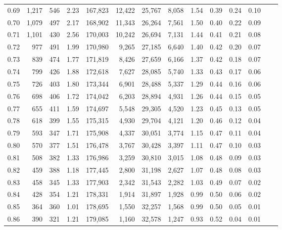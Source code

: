 \begin{tabular}{rrrrrrrrrrrrrr}
0.69 &  1,217 &  546 &    2.23 &  167,823 &   12,422 &  25,767 &   8,058 &  1.54 &  0.39 &  0.24 &      0.10 \\
0.70 &  1,079 &  497 &    2.17 &  168,902 &   11,343 &  26,264 &   7,561 &  1.50 &  0.40 &  0.22 &      0.09 \\
0.71 &  1,101 &  430 &    2.56 &  170,003 &   10,242 &  26,694 &   7,131 &  1.44 &  0.41 &  0.21 &      0.08 \\
0.72 &    977 &  491 &    1.99 &  170,980 &    9,265 &  27,185 &   6,640 &  1.40 &  0.42 &  0.20 &      0.07 \\
0.73 &    839 &  474 &    1.77 &  171,819 &    8,426 &  27,659 &   6,166 &  1.37 &  0.42 &  0.18 &      0.07 \\
0.74 &    799 &  426 &    1.88 &  172,618 &    7,627 &  28,085 &   5,740 &  1.33 &  0.43 &  0.17 &      0.06 \\
0.75 &    726 &  403 &    1.80 &  173,344 &    6,901 &  28,488 &   5,337 &  1.29 &  0.44 &  0.16 &      0.06 \\
0.76 &    698 &  406 &    1.72 &  174,042 &    6,203 &  28,894 &   4,931 &  1.26 &  0.44 &  0.15 &      0.05 \\
0.77 &    655 &  411 &    1.59 &  174,697 &    5,548 &  29,305 &   4,520 &  1.23 &  0.45 &  0.13 &      0.05 \\
0.78 &    618 &  399 &    1.55 &  175,315 &    4,930 &  29,704 &   4,121 &  1.20 &  0.46 &  0.12 &      0.04 \\
0.79 &    593 &  347 &    1.71 &  175,908 &    4,337 &  30,051 &   3,774 &  1.15 &  0.47 &  0.11 &      0.04 \\
0.80 &    570 &  377 &    1.51 &  176,478 &    3,767 &  30,428 &   3,397 &  1.11 &  0.47 &  0.10 &      0.03 \\
0.81 &    508 &  382 &    1.33 &  176,986 &    3,259 &  30,810 &   3,015 &  1.08 &  0.48 &  0.09 &      0.03 \\
0.82 &    459 &  388 &    1.18 &  177,445 &    2,800 &  31,198 &   2,627 &  1.07 &  0.48 &  0.08 &      0.03 \\
0.83 &    458 &  345 &    1.33 &  177,903 &    2,342 &  31,543 &   2,282 &  1.03 &  0.49 &  0.07 &      0.02 \\
0.84 &    428 &  354 &    1.21 &  178,331 &    1,914 &  31,897 &   1,928 &  0.99 &  0.50 &  0.06 &      0.02 \\
0.85 &    364 &  360 &    1.01 &  178,695 &    1,550 &  32,257 &   1,568 &  0.99 &  0.50 &  0.05 &      0.01 \\
0.86 &    390 &  321 &    1.21 &  179,085 &    1,160 &  32,578 &   1,247 &  0.93 &  0.52 &  0.04 &      0.01 \\

\end{tabular}
